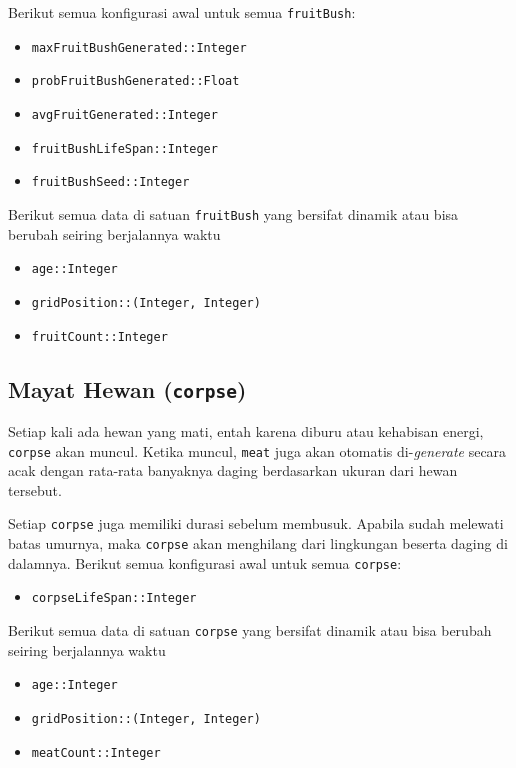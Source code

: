 \documentclass[12pt]{article}
\begin{document}
\noindent Berikut semua konfigurasi awal untuk semua \texttt{fruitBush}:
\begin{itemize}
    \item \texttt{maxFruitBushGenerated::Integer}
    \item \texttt{probFruitBushGenerated::Float }
    \item \texttt{avgFruitGenerated::Integer}
    \item \texttt{fruitBushLifeSpan::Integer}
    \item \texttt{fruitBushSeed::Integer}
\end{itemize}
\noindent Berikut semua data di satuan \texttt{fruitBush} yang bersifat dinamik atau bisa berubah seiring berjalannya waktu
\begin{itemize}
    \item \texttt{age::Integer}
    \item \texttt{gridPosition::(Integer, Integer)}
    \item \texttt{fruitCount::Integer}
\end{itemize}
\subsection{Mayat Hewan (\texttt{corpse})}
Setiap kali ada hewan yang mati, entah karena diburu atau kehabisan energi, \texttt{corpse} akan muncul. Ketika muncul, \texttt{meat} juga akan otomatis di-\textit{generate} secara acak dengan rata-rata banyaknya daging berdasarkan ukuran dari hewan tersebut.

\noindent Setiap \texttt{corpse} juga memiliki durasi sebelum membusuk. Apabila sudah melewati batas umurnya, maka \texttt{corpse} akan menghilang dari lingkungan beserta daging di dalamnya.
\noindent Berikut semua konfigurasi awal untuk semua \texttt{corpse}:
\begin{itemize}
    \item \texttt{corpseLifeSpan::Integer}
\end{itemize}
\noindent Berikut semua data di satuan \texttt{corpse} yang bersifat dinamik atau bisa berubah seiring berjalannya waktu
\begin{itemize}
    \item \texttt{age::Integer}
    \item \texttt{gridPosition::(Integer, Integer)}
    \item \texttt{meatCount::Integer}
\end{itemize}
\end{document}
